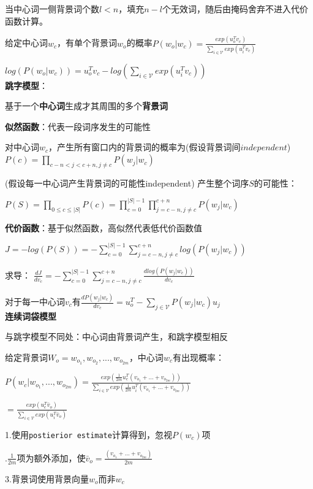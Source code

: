 \documentclass[UTF8]{ctexart}
\begin{document}
  \quad \quad 当中心词一侧背景词个数$l<n$，填充$n-l$个无效词，随后由掩码舍弃不进入代价函数计算。

  给定中心词$w_c$，有单个背景词$w_o$的概率$P(w_o | w_c) = \frac{exp(u_o^Tv_c)}{\sum_{i\in\mathcal{V} } exp(u_i^Tv_c)}$
  
  \quad $ log(P(w_o | w_c)) = u_o^Tv_c - log(\sum_{i\in\mathcal{V} } exp(u_i^Tv_c))$\\
\textbf{跳字模型}：
  
  基于一个\textbf{中心词}生成才其周围的多个\textbf{背景词}

  \textbf{似然函数}：代表一段词序发生的可能性

  \quad 对中心词$w_c$，产生所有窗口内的背景词的概率为(假设背景词间$independent$)$P(c) = \prod_{c-n<j<c+n, j \neq c} P(w_j | w_c)$

  \quad (假设每一中心词产生背景词的可能性independent) 产生整个词序$S$的可能性：
  
  \quad \quad $P(S) = \prod_{0\leq c \leq |S|} P(c) = \prod_{c = 0}^{|S|-1} \prod_{j = c-n, j \neq c}^{c+n} P(w_j | w_c)$
  
  \textbf{代价函数}：基于似然函数，高似然代表低代价函数值

  \quad $J = -log(P(S)) = -\sum_{c = 0}^{|S|-1} \sum_{j = c-n, j \neq c}^{c+n} log(P(w_j | w_c))$
  
  \quad 求导： $\frac{d J}{d v_c} = -\sum_{c = 0}^{|S|-1} \sum_{j = c-n, j \neq c}^{c+n} \frac{d log(P(w_j | w_c))}{d v_c}$

  \quad \quad 对于每一中心词$v_c$有$\frac{d P(w_j | w_c)}{d v_c} = u_o^T - \sum_{j\in\mathcal{V}}P(w_j | w_c)u_j$\\
\textbf{连续词袋模型}

  与跳字模型不同处：中心词由背景词产生，和跳字模型相反

  给定背景词$W_o = w_{o_1}, w_{o_2}, ..., w_{o_{2m}}$，中心词$w_c$有出现概率：
  
  \quad $P(w_c | w_{o_1}, ..., w_{o_{2m}}) = \frac{exp(\frac{1}{2m}u_c^T(v_{o_1} + ... + v_{o_{2m}}))}{\sum_{i\in \mathcal{V} } exp(\frac{1}{2m}u_i^T(v_{o_1} + ... + v_{o_{2m}}))}$

  \quad \quad $= \frac{exp(u_c^T\bar{v}_o)}{\sum_{i\in \mathcal{V} } exp(u_i^T\bar{v}_o )}$

  \quad 1.使用\texttt{postierior estimate}计算得到，忽视$P(w_c)$项

  .$\frac{1}{2m}$项为额外添加，使$\bar{v}_o = \frac{(v_{o_1} + ... + v_{o_{2m}})}{2m}$

  \quad 3.背景词使用背景向量$w_o$而非$w_c$
  
\end{document}
